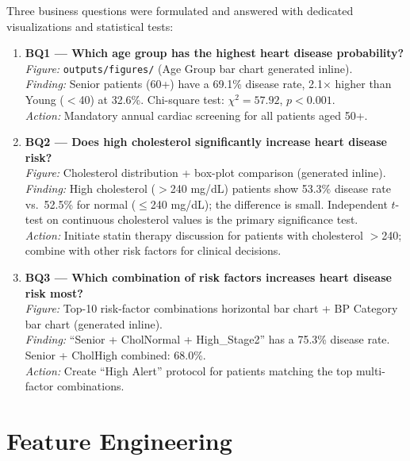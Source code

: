 \documentclass[12pt,a4paper]{article}
\begin{document}
Three business questions were formulated and answered with dedicated visualizations and statistical tests:

\begin{enumerate}
    \item \textbf{BQ1 --- Which age group has the highest heart disease probability?}\\
    \textit{Figure:} \texttt{outputs/figures/} (Age Group bar chart generated inline).\\
    \textit{Finding:} Senior patients (60+) have a 69.1\% disease rate, 2.1$\times$ higher than Young ($<$40) at 32.6\%.  Chi-square test: $\chi^2 = 57.92$, $p < 0.001$.\\
    \textit{Action:} Mandatory annual cardiac screening for all patients aged 50+.

    \item \textbf{BQ2 --- Does high cholesterol significantly increase heart disease risk?}\\
    \textit{Figure:} Cholesterol distribution + box-plot comparison (generated inline).\\
    \textit{Finding:} High cholesterol ($>$240 mg/dL) patients show 53.3\% disease rate vs.\ 52.5\% for normal ($\leq$240 mg/dL); the difference is small.  Independent $t$-test on continuous cholesterol values is the primary significance test.\\
    \textit{Action:} Initiate statin therapy discussion for patients with cholesterol $>$240; combine with other risk factors for clinical decisions.

    \item \textbf{BQ3 --- Which combination of risk factors increases heart disease risk most?}\\
    \textit{Figure:} Top-10 risk-factor combinations horizontal bar chart + BP Category bar chart (generated inline).\\
    \textit{Finding:} ``Senior + CholNormal + High\_Stage2'' has a 75.3\% disease rate.  Senior + CholHigh combined: 68.0\%.\\
    \textit{Action:} Create ``High Alert'' protocol for patients matching the top multi-factor combinations.
\end{enumerate}

\section{Feature Engineering}
\end{document}
